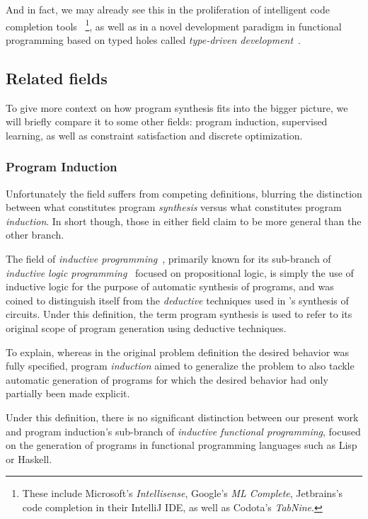 \documentclass{article}
\begin{document}
And in fact, we may already see this in the proliferation of intelligent code completion tools%
~\footnote{
    These include Microsoft's \emph{Intellisense},
    Google's \emph{ML Complete},
    Jetbrains's code completion in their IntelliJ IDE,
    as well as Codota's \emph{TabNine}.
},
as well as in a novel development paradigm in functional programming based on typed holes called \emph{type-driven development}~\citep{brady2017type}.

\subsection{Related fields}

To give more context on how program synthesis fits into the bigger picture,
we will briefly compare it to some other fields: program induction, supervised learning, as well as constraint satisfaction and discrete optimization.

\subsubsection{Program Induction}

Unfortunately the field suffers from competing definitions, blurring the distinction between what constitutes program \emph{synthesis} versus what constitutes program \emph{induction}. In short though, those in either field claim to be more general than the other branch.

The field of \emph{inductive programming}~\citep{popplestone1969experiment,plotkin1970note,fogel1966intelligent}, primarily known for its sub-branch of \emph{inductive logic programming}~\citep{muggleton1991inductive} focused on propositional logic, is simply the use of inductive logic for the purpose of automatic synthesis of programs, and was coined to distinguish itself from the \emph{deductive} techniques used in \citet{church1957applications}'s synthesis of circuits. Under this definition, the term program synthesis is used to refer to its original scope of program generation using deductive techniques.

To explain, whereas in the original problem definition the desired behavior was fully specified, program \emph{induction} aimed to generalize the problem to also tackle automatic generation of programs for which the desired behavior had only partially been made explicit.

Under this definition, there is no significant distinction between our present work and program induction's sub-branch of \emph{inductive functional programming}, focused on the generation of programs in functional programming languages such as Lisp~\citep{lisp} or Haskell.
\end{document}
